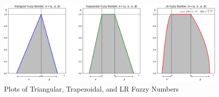 \begin{figure}[H]
    \centering
    \includegraphics[width=\textwidth]{ch1/figures/fuzzy_numbers.png}
    \caption{Plots of Triangular, Trapezoidal, and LR Fuzzy Numbers}
    \label{fig:fuzzy_numbers}
\end{figure}









